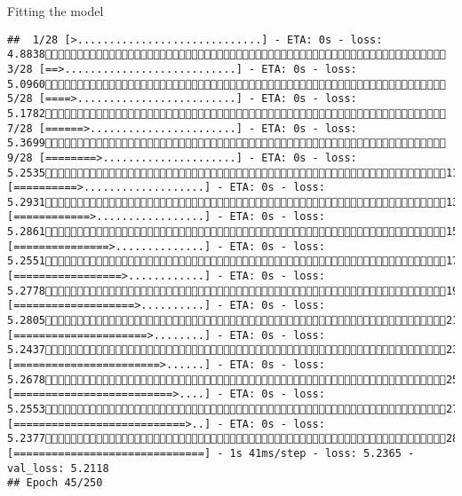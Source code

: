\documentclass[
  ignorenonframetext,
]{beamer}
\begin{document}
\begin{frame}[fragile]{Fitting the model}
\begin{verbatim}
##  1/28 [>.............................] - ETA: 0s - loss: 4.8838 3/28 [==>...........................] - ETA: 0s - loss: 5.0960 5/28 [====>.........................] - ETA: 0s - loss: 5.1782 7/28 [======>.......................] - ETA: 0s - loss: 5.3699 9/28 [========>.....................] - ETA: 0s - loss: 5.253511/28 [==========>...................] - ETA: 0s - loss: 5.293113/28 [============>.................] - ETA: 0s - loss: 5.286115/28 [===============>..............] - ETA: 0s - loss: 5.255117/28 [=================>............] - ETA: 0s - loss: 5.277819/28 [===================>..........] - ETA: 0s - loss: 5.280521/28 [=====================>........] - ETA: 0s - loss: 5.243723/28 [=======================>......] - ETA: 0s - loss: 5.267825/28 [=========================>....] - ETA: 0s - loss: 5.255327/28 [===========================>..] - ETA: 0s - loss: 5.237728/28 [==============================] - 1s 41ms/step - loss: 5.2365 - val_loss: 5.2118
## Epoch 45/250

\end{verbatim}
\end{frame}
\end{document}
